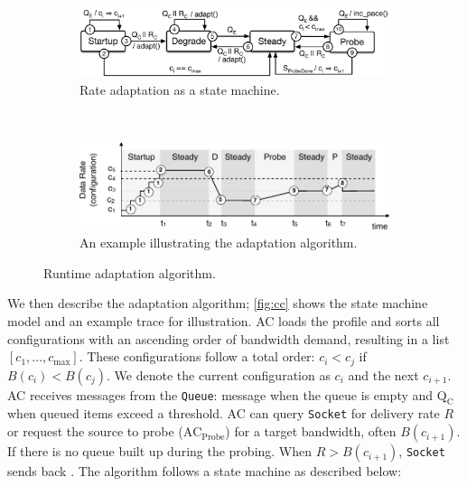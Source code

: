 \begin{figure}
  \begin{subfigure}[t]{\columnwidth}
    \centering
    \includegraphics[width=\columnwidth]{figures/cc.pdf}
    \caption{Rate adaptation as a state machine.}
    \vspace{1em}
    \label{fig:cc-sm}
  \end{subfigure}
  \\
  \centering
  \begin{subfigure}[t]{\columnwidth}
    \centering
    \includegraphics[width=\columnwidth]{figures/cc2.pdf}
    \caption{An example illustrating the adaptation algorithm.}
    \label{fig:cc-ex}
  \end{subfigure}
  \caption{Runtime adaptation algorithm.}
  \label{fig:cc}
\end{figure}

We then describe the adaptation algorithm; \autoref{fig:cc} shows the state
machine model and an example trace for illustration.  AC loads the profile and
sorts all configurations with an ascending order of bandwidth demand, resulting
in a list $[c_1, \dots, c_{\max}]$.  These configurations follow a total order:
$c_i < c_j$ if $B(c_i) < B(c_j)$.  We denote the current configuration as $c_i$
and the next $c_{i+1}$.  AC receives messages from the \texttt{Queue}: message
\qe{} when the queue is empty and $\text{Q}_\text{C}$ when queued items exceed a
threshold. AC can query \texttt{Socket} for delivery rate $R$ or request the
source to probe ($\text{AC}_{\text{Probe}}$) for a target bandwidth, often
$B(c_{i+1})$. If there is no queue built up during the probing.  When
$R > B(c_{i+1})$, \texttt{Socket} sends back \spd{}. The algorithm follows a
state machine as described below:

